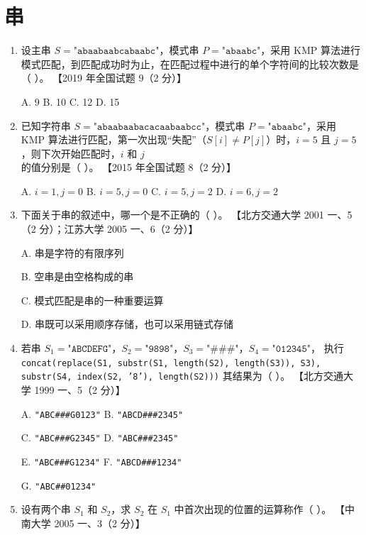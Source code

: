 \documentclass[lang=cn,newtx,10pt,scheme=chinese]{../../elegantbook}
\begin{document}
\chapter{串}
\begin{enumerate}

    \item 设主串 $S = \texttt{"abaabaabcabaabc"}$，模式串 $P = \texttt{"abaabc"}$，采用 KMP 算法进行模式匹配，到匹配成功时为止，在匹配过程中进行的单个字符间的比较次数是（ ）。  
    【2019 年全国试题 9（2 分）】

    A. 9 \quad B. 10 \quad C. 12 \quad D. 15  

    \item 已知字符串 $S = \texttt{"abaabaabacacaabaabcc"}$，模式串 $P = \texttt{"abaabc"}$，采用 KMP 算法进行匹配，第一次出现“失配”（$S[i] \neq P[j]$）时，$i=5$ 且 $j=5$，则下次开始匹配时，$i$ 和 $j$ 的值分别是（ ）。  
    【2015 年全国试题 8（2 分）】  

    A. $i=1, j=0$ \quad B. $i=5, j=0$ \quad C. $i=5, j=2$ \quad D. $i=6, j=2$  

    \item 下面关于串的叙述中，哪一个是不正确的（ ）。  
    【北方交通大学 2001 一、5（2 分）；江苏大学 2005 一、6（2 分）】  

    A. 串是字符的有限序列  

    B. 空串是由空格构成的串  

    C. 模式匹配是串的一种重要运算 

    D. 串既可以采用顺序存储，也可以采用链式存储  

    \item 若串 $S_1 = \texttt{"ABCDEFG"}$，$S_2 = \texttt{"9898"}$，$S_3 = \texttt{"\#\#\#"}$，$S_4 = \texttt{"012345"}$，
    执行  
    \texttt{concat(replace(S1, substr(S1, length(S2), length(S3)), S3), substr(S4, index(S2, '8'), length(S2)))}  
    其结果为（ ）。  
    【北方交通大学 1999 一、5（2 分）】  

    A. \texttt{"ABC\#\#\#{G0123}"} \quad B. \texttt{"ABCD\#\#\#{2345}"}  

    C. \texttt{"ABC\#\#\#{G2345}"} \quad D. \texttt{"ABC\#\#\#{2345}"}  

    E. \texttt{"ABC\#\#\#{G1234}"} \quad F. \texttt{"ABCD\#\#\#{1234}"}  

    G. \texttt{"ABC\#\#{01234}"}
    \item 设有两个串 $S_1$ 和 $S_2$，求 $S_2$ 在 $S_1$ 中首次出现的位置的运算称作（ ）。  
    【中南大学 2005 一、3（2 分）】  


\end{enumerate}
\end{document}
